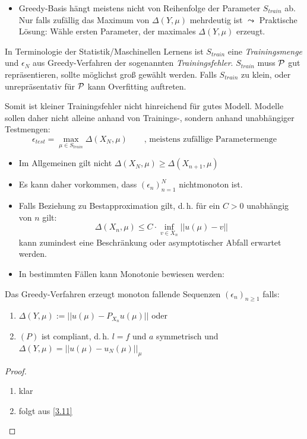 \begin{bem}[Reihenfolge] \beginwithlistbem
	\begin{itemize}
		\item Greedy-Basis hängt meistens nicht von Reihenfolge der Parameter $S_{train}$ ab. Nur falls zufällig das Maximum von $\Delta(Y,\mu)$ mehrdeutig ist $\leadsto$ Praktische Lösung: Wähle ersten Parameter, der maximales $\Delta(Y,\mu)$ erzeugt.
	\end{itemize}
\end{bem}

\begin{bem}
In Terminologie der Statistik/Maschinellen Lernens ist $S_{train}$ eine \emph{Trainingsmenge} und $\epsilon_N$ aus Greedy-Verfahren der sogenannten \emph{Trainingsfehler}. $S_{train}$ muss $\mathcal{P}$ gut repräsentieren, sollte möglichst groß gewählt werden. Falls $S_{train}$ zu klein, oder unrepräsentativ für $\mathcal{P}$ kann Overfitting auftreten.

Somit ist kleiner Trainingsfehler nicht hinreichend für gutes Modell. Modelle sollen daher nicht alleine anhand von Trainings-, sondern anhand unabhängiger Testmengen:
\[
	\epsilon_{test} = \max\limits_{\mu \in S_{train}} \Delta(X_N,\mu) \qquad \text{, meistens zufällige Parametermenge}
\]
\end{bem}

\begin{bem}[Monotonie] \beginwithlistbem
	\begin{itemize}
		\item Im Allgemeinen gilt nicht $\Delta(X_N,\mu) \geq \Delta(X_{n+1},\mu)$
		\item Es kann daher vorkommen, dass $(\epsilon_n)_{n=1}^N$ nichtmonoton ist.
		\item Falls Beziehung zu Bestapproximation gilt, d.\,h. für ein $C > 0$ unabhängig von $n$ gilt:
		\[
			\Delta(X_n,\mu) \leq C \cdot \inf\limits_{v \in X_n} ||u(\mu) - v||
		\]
		kann zumindest eine Beschränkung oder asymptotischer Abfall erwartet werden.
		\item In bestimmten Fällen kann Monotonie bewiesen werden:
	\end{itemize}
\end{bem}

\begin{satz}
Das Greedy-Verfahren erzeugt monoton fallende Sequenzen $(\epsilon_n)_{n\geq 1}$ falls:
\begin{enumerate}
	\item $\Delta (Y,\mu) := ||u(\mu) - P_{X_n}u(\mu)||$ oder
	\item $(P)$ ist compliant, d.\,h. $l=f$ und $a$ symmetrisch und $\Delta(Y,\mu) = ||u(\mu) - u_N(\mu)||_{\mu}$
\end{enumerate}
\begin{proof}
	\begin{enumerate}
	\item klar
	\item folgt aus \ref{3.11}
	\end{enumerate}
\end{proof}
\end{satz}

